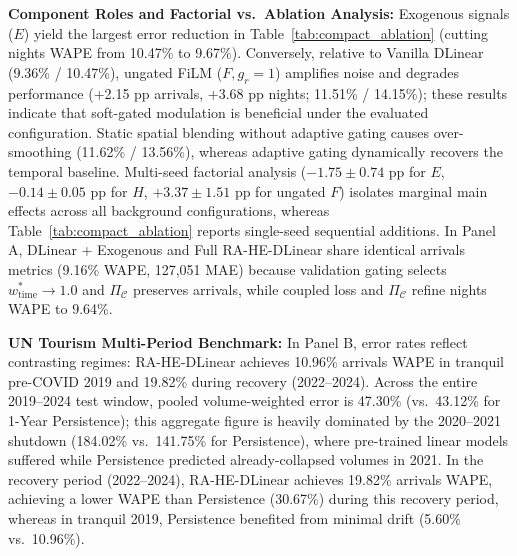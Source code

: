 \documentclass[sigconf]{acmart}
\begin{document}
\textbf{Component Roles and Factorial vs.\ Ablation Analysis:} Exogenous signals ($E$) yield the largest error reduction in Table~\ref{tab:compact_ablation} (cutting nights WAPE from 10.47\% to 9.67\%). Conversely, relative to Vanilla DLinear (9.36\% / 10.47\%), ungated FiLM ($F, g_r=1$) amplifies noise and degrades performance (+2.15 pp arrivals, +3.68 pp nights; 11.51\% / 14.15\%); these results indicate that soft-gated modulation is beneficial under the evaluated configuration. Static spatial blending without adaptive gating causes over-smoothing (11.62\% / 13.56\%), whereas adaptive gating dynamically recovers the temporal baseline. Multi-seed factorial analysis ($-1.75\pm0.74$ pp for $E$, $-0.14\pm0.05$ pp for $H$, $+3.37\pm1.51$ pp for ungated $F$) isolates marginal main effects across all background configurations, whereas Table~\ref{tab:compact_ablation} reports single-seed sequential additions. In Panel A, DLinear + Exogenous and Full RA-HE-DLinear share identical arrivals metrics (9.16\% WAPE, 127,051 MAE) because validation gating selects $w_{\text{time}}^*\to 1.0$ and $\Pi_{\mathcal{C}}$ preserves arrivals, while coupled loss and $\Pi_{\mathcal{C}}$ refine nights WAPE to 9.64\%.

\textbf{UN Tourism Multi-Period Benchmark:} In Panel B, error rates reflect contrasting regimes: RA-HE-DLinear achieves 10.96\% arrivals WAPE in tranquil pre-COVID 2019 and 19.82\% during recovery (2022--2024). Across the entire 2019--2024 test window, pooled volume-weighted error is 47.30\% (vs.\ 43.12\% for 1-Year Persistence); this aggregate figure is heavily dominated by the 2020--2021 shutdown (184.02\% vs.\ 141.75\% for Persistence), where pre-trained linear models suffered while Persistence predicted already-collapsed volumes in 2021. In the recovery period (2022--2024), RA-HE-DLinear achieves 19.82\% arrivals WAPE, achieving a lower WAPE than Persistence (30.67\%) during this recovery period, whereas in tranquil 2019, Persistence benefited from minimal drift (5.60\% vs.\ 10.96\%).
\end{document}
